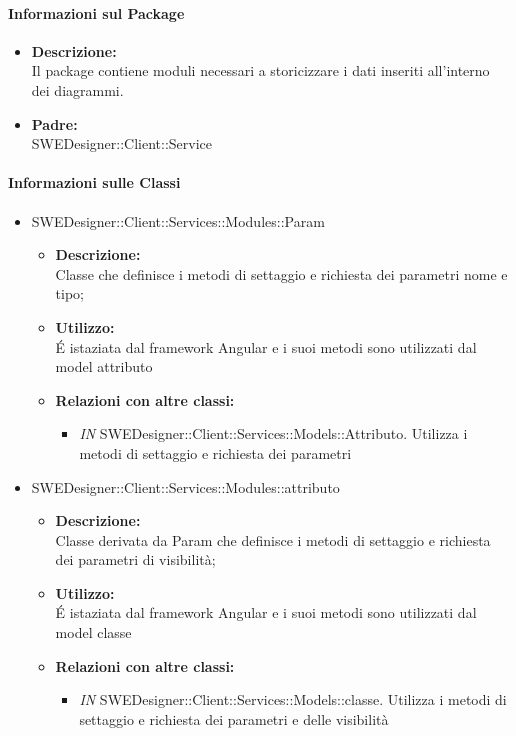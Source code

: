\begin{itemize}
		\paragraph{Informazioni sul Package}
		\begin{itemize}
			\item \textbf{Descrizione: }\\
			Il package contiene moduli necessari a storicizzare i dati inseriti all'interno dei diagrammi.
			\item \textbf{Padre: }\\ SWEDesigner::Client::Service
		\end{itemize}
		\paragraph{Informazioni sulle Classi}
		\begin{itemize}
		\item SWEDesigner::Client::Services::Modules::Param
		\begin{itemize}
			\item \textbf{Descrizione:}\\
			Classe che definisce i metodi di settaggio e richiesta dei parametri nome e tipo;
			\item \textbf{Utilizzo:}\\
			É istaziata dal framework Angular e i suoi metodi sono utilizzati dal model attributo
			\item \textbf{Relazioni con altre classi: }
			\begin{itemize}
			\item \emph{IN} SWEDesigner::Client::Services::Models::Attributo. Utilizza i metodi di settaggio e richiesta dei parametri
			\end{itemize}
		\end{itemize}
		
		\item SWEDesigner::Client::Services::Modules::attributo
		\begin{itemize}
			\item \textbf{Descrizione:}\\
			Classe derivata da Param che definisce i metodi di settaggio e richiesta dei parametri di visibilità;
			\item \textbf{Utilizzo:}\\
			É istaziata dal framework Angular e i suoi metodi sono utilizzati dal model classe
			\item \textbf{Relazioni con altre classi: }
			\begin{itemize}
			\item \emph{IN} SWEDesigner::Client::Services::Models::classe. Utilizza i metodi di settaggio e richiesta dei parametri e delle visibilità
			\end{itemize}
		\end{itemize}	
		

\end{itemize}
\end{itemize}
